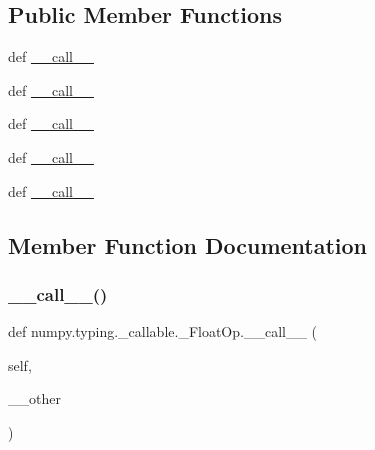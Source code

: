 \subsection*{Public Member Functions}
\begin{DoxyCompactItemize}
\item 
def \hyperlink{classnumpy_1_1typing_1_1__callable_1_1__FloatOp_a8a2f2403c3efbe6fbab017e5e931dea5}{\+\_\+\+\_\+call\+\_\+\+\_\+}
\item 
def \hyperlink{classnumpy_1_1typing_1_1__callable_1_1__FloatOp_a8a2f2403c3efbe6fbab017e5e931dea5}{\+\_\+\+\_\+call\+\_\+\+\_\+}
\item 
def \hyperlink{classnumpy_1_1typing_1_1__callable_1_1__FloatOp_a8a2f2403c3efbe6fbab017e5e931dea5}{\+\_\+\+\_\+call\+\_\+\+\_\+}
\item 
def \hyperlink{classnumpy_1_1typing_1_1__callable_1_1__FloatOp_a8a2f2403c3efbe6fbab017e5e931dea5}{\+\_\+\+\_\+call\+\_\+\+\_\+}
\item 
def \hyperlink{classnumpy_1_1typing_1_1__callable_1_1__FloatOp_a8a2f2403c3efbe6fbab017e5e931dea5}{\+\_\+\+\_\+call\+\_\+\+\_\+}
\end{DoxyCompactItemize}


\subsection{Member Function Documentation}
\mbox{\label{classnumpy_1_1typing_1_1__callable_1_1__FloatOp_a8a2f2403c3efbe6fbab017e5e931dea5}} 
\subsubsection{\texorpdfstring{\+\_\+\+\_\+call\+\_\+\+\_\+()}{\_\_call\_\_()}\hspace{0.1cm}{\footnotesize\ttfamily [1/5]}}
{\footnotesize\ttfamily def numpy.\+typing.\+\_\+callable.\+\_\+\+Float\+Op.\+\_\+\+\_\+call\+\_\+\+\_\+ (\begin{DoxyParamCaption}\item[{}]{self,  }\item[{}]{\+\_\+\+\_\+other }\end{DoxyParamCaption})}

